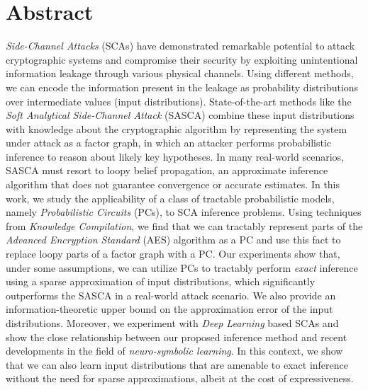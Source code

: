 \chapter{Abstract}

\emph{Side-Channel Attacks} (SCAs) have demonstrated remarkable potential to attack cryptographic systems and compromise their security by exploiting unintentional information leakage through various physical channels. Using different methods, we can encode the information present in the leakage as probability distributions over intermediate values (input distributions). State-of-the-art methods like the \emph{Soft Analytical Side-Channel Attack} (SASCA) combine these input distributions with knowledge about the cryptographic algorithm by representing the system under attack as a factor graph, in which an attacker performs probabilistic inference to reason about likely key hypotheses. In many real-world scenarios, SASCA must resort to loopy belief propagation, an approximate inference algorithm that does not guarantee convergence or accurate estimates.
In this work, we study the applicability of a class of tractable probabilistic models, namely \emph{Probabilistic Circuits} (PCs), to SCA inference problems. Using techniques from \emph{Knowledge Compilation}, we find that we can tractably represent parts of the \emph{Advanced Encryption Standard} (AES) algorithm as a PC and use this fact to replace loopy parts of a factor graph with a PC. Our experiments show that, under some assumptions, we can utilize PCs to tractably perform \emph{exact} inference using a sparse approximation of input distributions, which significantly outperforms the SASCA in a real-world attack scenario. We also provide an information-theoretic upper bound on the approximation error of the input distributions.
Moreover, we experiment with \emph{Deep Learning} based SCAs and show the close relationship between our proposed inference method and recent developments in the field of \emph{neuro-symbolic learning}. In this context, we show that we can also learn input distributions that are amenable to exact inference without the need for sparse approximations, albeit at the cost of expressiveness.